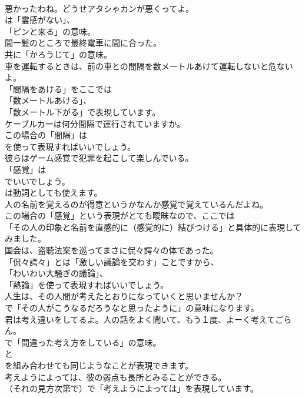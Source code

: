 \documentclass[8pt]{extreport}
\begin{document}
\begin{CJK}{UTF8}{min}
\\	悪かったわね。どうせアタシゃカンが悪くってよ。 
\\	は「霊感がない」、
\\	「ピンと来る」の意味。	
\\	間一髪のところで最終電車に間に合った。 
\\	共に「かろうじて」の意味。	
\\	車を運転するときは、前の車との間隔を数メートルあけて運転しないと危ないよ。 
\\	「間隔をあける」をここでは
\\	「数メートルあける」、
\\	「数メートル下がる」で表現しています。	
\\	ケーブルカーは何分間隔で運行されていますか。 
\\	この場合の「間隔」は 
\\	を使って表現すればいいでしょう。	
\\	彼らはゲーム感覚で犯罪を起こして楽しんでいる。 
\\	「感覚」は
\\	でいいでしょう。
\\	は動詞としても使えます。	
\\	人の名前を覚えるのが得意というかなんか感覚で覚えているんだよね。 
\\	この場合の「感覚」という表現がとても曖昧なので、ここでは
\\	「その人の印象と名前を直感的に（感覚的に）結びつける」と具体的に表現してみました。	
\\	国会は、盗聴法案を巡ってまさに侃々諤々の体であった。 
\\	「侃々諤々」とは「激しい議論を交わす」ことですから、
\\	「わいわい大騒ぎの議論」、
\\	「熱論」を使って表現すればいいでしょう。	
\\	人生は、その人間が考えたとおりになっていくと思いませんか？ 
\\	で「その人がこうなるだろうなと思ったように」の意味になります。	
\\	君は考え違いをしてるよ。人の話をよく聞いて、もう１度、よーく考えてごらん。 
\\	で「間違った考え方をしている」の意味。
\\	と
\\	を組み合わせても同じようなことが表現できます。	
\\	考えようによっては、彼の弱点も長所とみることができる。 
\\	（それの見方次第で）で「考えようによっては」を表現しています。	

\end{CJK}
\end{document}
